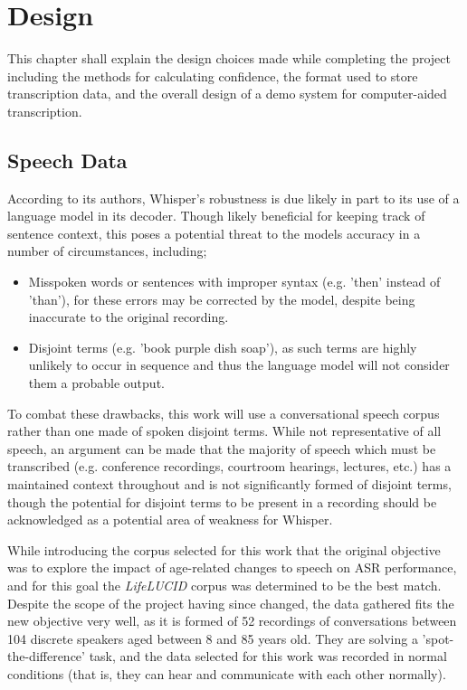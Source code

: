 \chapter{Design}\label{ch:design}

This chapter shall explain the design choices made while completing the project including the methods for calculating confidence, the format used to store transcription data, and the overall design of a demo system for computer-aided transcription.

\section{Speech Data}

According to its authors, Whisper's robustness is due likely in part to its use of a language model in its decoder\cite{whisper}.
Though likely beneficial for keeping track of sentence context, this poses a potential threat to the models accuracy in a number of circumstances, including;

\begin{itemize}
  \item Misspoken words or sentences with improper syntax (e.g. 'then' instead of 'than'), for these errors may be corrected by the model, despite being inaccurate to the original recording.
  \item Disjoint terms (e.g. 'book purple dish soap'), as such terms are highly unlikely to occur in sequence and thus the language model will not consider them a probable output.
\end{itemize}

To combat these drawbacks, this work will use a conversational speech corpus rather than one made of spoken disjoint terms.
While not representative of all speech, an argument can be made that the majority of speech which must be transcribed (e.g. conference recordings, courtroom hearings, lectures, etc.) has a maintained context throughout and is not significantly formed of disjoint terms, though the potential for disjoint terms to be present in a recording should be acknowledged as a potential area of weakness for Whisper.

While introducing the corpus selected for this work that the original objective was to explore the impact of age-related changes to speech on ASR performance, and for this goal the \emph{LifeLUCID} corpus\cite{lifelucid} was determined to be the best match.
Despite the scope of the project having since changed, the data gathered fits the new objective very well, as it is formed of 52 recordings of conversations between 104 discrete speakers aged between 8 and 85 years old.
They are solving a 'spot-the-difference' task, and the data selected for this work was recorded in normal conditions (that is, they can hear and communicate with each other normally).

